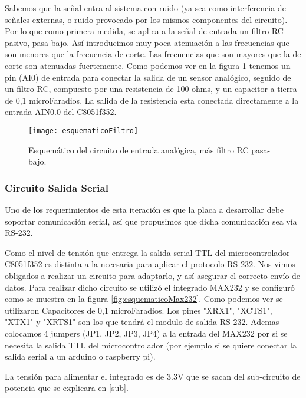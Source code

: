 Sabemos que la señal entra al sistema con ruido (ya sea como interferencia de señales externas, o ruido provocado por los mismos componentes del circuito). Por lo que como primera medida, se aplica a la señal de entrada un filtro RC pasivo, pasa bajo. Así introducimos muy poca atenuación a las frecuencias que son menores que la frecuencia de corte. Las frecuencias que son mayores que la de corte son atenuadas fuertemente. 
Como podemos ver en la figura \ref{fig:esquematicoFiltro} tenemos un pin (AI0) de entrada para conectar la salida de un sensor analógico, seguido de un filtro RC, compuesto por una resistencia de 100 ohms, y un capacitor a tierra de 0,1 microFaradios. La salida de la resistencia esta conectada directamente a la entrada AIN0.0 del C8051f352.

\begin{figure}[h]
  \centering
  \texttt{[image: esquematicoFiltro]}
  \caption{Esquemático del circuito de entrada analógica, más filtro RC pasa-bajo.}\label{fig:esquematicoFiltro}
\end{figure}


\subsubsection{Circuito Salida Serial}
\label{salida_serial}

Uno de los requerimientos de esta iteración es que la placa a desarrollar debe soportar comunicación serial, así que propusimos que dicha comunicación sea vía RS-232.

Como el nivel de tensión que entrega la salida serial TTL del microcontrolador C8051f352 es distinta a la necesaria para aplicar el protocolo RS-232. Nos vimos obligados a realizar un circuito para adaptarlo, y así asegurar el correcto envío de datos. Para realizar dicho circuito se utilizó el integrado MAX232 y se configuró como se muestra en la figura \ref{fig:esquematicoMax232}. Como podemos ver se utilizaron Capacitores de 0,1 microFaradios. Los pines "XRX1", "XCTS1", "XTX1" y "XRTS1" son los que tendrá el modulo de salida RS-232.
Ademas colocamos 4 jumpers (JP1, JP2, JP3, JP4) a la entrada del MAX232 por si se necesita la salida TTL del microcontrolador (por ejemplo si se quiere conectar la salida serial a un arduino o raspberry pi).

La tensión para alimentar el integrado es de 3.3V que se sacan del sub-circuito de potencia que se explicara en \ref{sub}.

